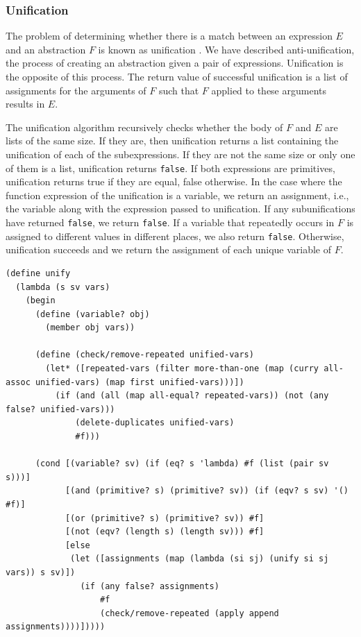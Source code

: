 \documentclass[a4paper,10pt]{article}
\begin{document}


\subsubsection{Unification}

The problem of determining whether there is a match between an expression $E$ and an abstraction $F$ is known as unification \cite{Robinson:1965:MLB:321250.321253}. We have described anti-unification, the process of creating an abstraction given a pair of expressions. Unification is the opposite of this process.  The return value of successful unification is a list of assignments for the arguments of $F$ such that $F$ applied to these arguments results in $E$.

The unification algorithm recursively checks whether the body of $F$ and $E$ are lists of the same size.  If they are, then unification returns a list containing the unification of each of the subexpressions.  If they are not the same size or only one of them is a list, unification returns \texttt{false}.  If both expressions are primitives, unification returns true if they are equal, false otherwise.  In the case where the function expression of the unification is a variable, we return an assignment, i.e., the variable along with the expression passed to unification. If any subunifications have returned \texttt{false}, we return \texttt{false}. If a variable that repeatedly occurs in $F$ is assigned to different values in different places, we also return \texttt{false}.
Otherwise, unification succeeds and we return the assignment of each unique variable of $F$.

\begin{lstlisting}[frame=trbl]
(define unify
  (lambda (s sv vars)
    (begin
      (define (variable? obj)
        (member obj vars))

      (define (check/remove-repeated unified-vars)
        (let* ([repeated-vars (filter more-than-one (map (curry all-assoc unified-vars) (map first unified-vars)))])
          (if (and (all (map all-equal? repeated-vars)) (not (any false? unified-vars)))
              (delete-duplicates unified-vars)
              #f)))
      
      (cond [(variable? sv) (if (eq? s 'lambda) #f (list (pair sv s)))]
            [(and (primitive? s) (primitive? sv)) (if (eqv? s sv) '() #f)]
            [(or (primitive? s) (primitive? sv)) #f]
            [(not (eqv? (length s) (length sv))) #f]
            [else
             (let ([assignments (map (lambda (si sj) (unify si sj vars)) s sv)])
               (if (any false? assignments)
                   #f
                   (check/remove-repeated (apply append assignments))))]))))
\end{lstlisting}
\end{document}
